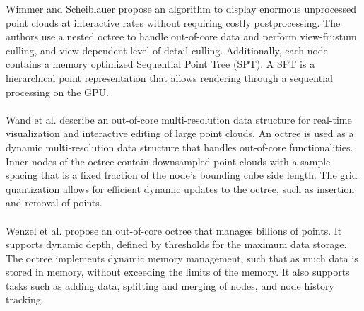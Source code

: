 Wimmer and Scheiblauer \cite{wimmer2006instant} propose an algorithm to display enormous unprocessed point clouds at interactive rates without requiring costly postprocessing. The authors use a nested octree to handle out-of-core data and perform view-frustum culling, and view-dependent level-of-detail culling. Additionally, each node contains a memory optimized Sequential Point Tree (SPT). A SPT is a hierarchical point representation that allows rendering through a sequential processing on the GPU.  
\\
\\
Wand et al. \cite{wand2007interactive} describe an out-of-core multi-resolution data structure for real-time visualization and interactive editing of large point clouds. An octree is used as a dynamic multi-resolution data structure that handles out-of-core functionalities. Inner nodes of the octree contain downsampled point clouds with a sample spacing that is a fixed fraction of the node's bounding cube side length. The grid quantization allows for efficient dynamic updates to the octree, such as insertion and removal of points. 
\\
\\
Wenzel et al. \cite{wenzel2014out} propose an out-of-core octree that manages billions of points. It supports dynamic depth, defined by thresholds for the maximum data storage. The octree implements dynamic memory management, such that as much data is stored in memory, without exceeding the limits of the memory. It also supports tasks such as adding data, splitting and merging of nodes, and node history tracking. 

